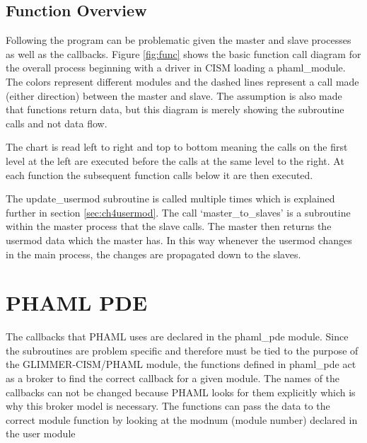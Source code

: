\subsection{Function Overview}

Following the program can be problematic given the master and slave processes as well as the callbacks.  Figure \ref{fig:func} shows the basic function call diagram for the overall process beginning with a driver in CISM loading a phaml\_module.  The colors represent different modules and the dashed lines represent a call made (either direction) between the master and slave.  The assumption is also made that functions return data, but this diagram is merely showing the subroutine calls and not data flow.

The chart is read left to right and top to bottom meaning the calls on the first level at the left are executed before the calls at the same level to the right.  At each function the subsequent function calls below it are then executed.

The update\_usermod subroutine is called multiple times which is explained further in section \ref{sec:ch4usermod}.  The call `master\_to\_slaves' is a subroutine within the master process that the slave calls.  The master then returns the usermod data which the master has.  In this way whenever the usermod changes in the main process, the changes are propagated down to the slaves.



  



\newpage

\section{PHAML PDE}\label{sec:ch4phamlpde}

The callbacks that PHAML uses are declared in the phaml\_pde module.  Since the subroutines are problem specific and therefore must be tied to the purpose of the GLIMMER-CISM/PHAML module, the functions defined in phaml\_pde act as a broker to find the correct callback for a given module.  The names of the callbacks can not be changed because PHAML looks for them explicitly which is why this broker model is necessary.  The functions can pass the data to the correct module function by looking at the modnum (module number) declared in the user module

